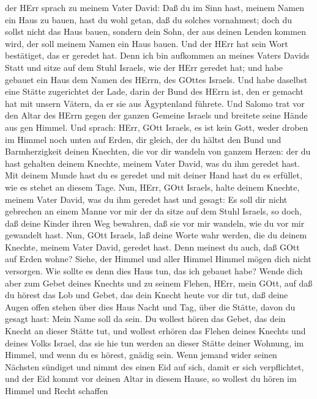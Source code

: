 der HErr sprach zu meinem Vater David: Daß du im Sinn hast, meinem Namen
ein Haus zu bauen, hast du wohl getan, daß du solches vornahmest;
 doch du sollst nicht das Haus bauen, sondern dein Sohn,
der aus deinen Lenden kommen wird, der soll meinem Namen ein Haus bauen.
 Und der HErr hat sein Wort bestätiget, das er geredet hat.
Denn ich bin aufkommen an meines Vaters Davids Statt und sitze auf dem
Stuhl Israels, wie der HErr geredet hat; und habe gebauet ein Haus dem
Namen des HErrn, des GOttes Israels.  Und habe daselbst
eine Stätte zugerichtet der Lade, darin der Bund des HErrn ist, den er
gemacht hat mit unsern Vätern, da er sie aus Ägyptenland führete.
 Und Salomo trat vor den Altar des HErrn gegen der ganzen
Gemeine Israels und breitete seine Hände aus gen Himmel. 
Und sprach: HErr, GOtt Israels, es ist kein Gott, weder droben im Himmel
noch unten auf Erden, dir gleich, der du hältst den Bund und
Barmherzigkeit deinen Knechten, die vor dir wandeln von ganzem Herzen:
 der du hast gehalten deinem Knechte, meinem Vater David,
was du ihm geredet hast. Mit deinem Munde hast du es geredet und mit
deiner Hand hast du es erfüllet, wie es stehet an diesem Tage.
 Nun, HErr, GOtt Israels, halte deinem Knechte, meinem
Vater David, was du ihm geredet hast und gesagt: Es soll dir nicht
gebrechen an einem Manne vor mir der da sitze auf dem Stuhl Israels, so
doch, daß deine Kinder ihren Weg bewahren, daß sie vor mir wandeln, wie
du vor mir gewandelt hast.  Nun, GOtt Israels, laß deine
Worte wahr werden, die du deinem Knechte, meinem Vater David, geredet
hast.  Denn meinest du auch, daß GOtt auf Erden wohne?
Siehe, der Himmel und aller Himmel Himmel mögen dich nicht versorgen.
Wie sollte es denn dies Haus tun, das ich gebauet habe? 
Wende dich aber zum Gebet deines Knechts und zu seinem Flehen, HErr,
mein GOtt, auf daß du hörest das Lob und Gebet, das dein Knecht heute
vor dir tut,  daß deine Augen offen stehen über dies Haus
Nacht und Tag, über die Stätte, davon du gesagt hast: Mein Name soll da
sein. Du wollest hören das Gebet, das dein Knecht an dieser Stätte tut,
 und wollest erhören das Flehen deines Knechts und deines
Volks Israel, das sie hie tun werden an dieser Stätte deiner Wohnung, im
Himmel, und wenn du es hörest, gnädig sein.  Wenn jemand
wider seinen Nächsten sündiget und nimmt des einen Eid auf sich, damit
er sich verpflichtet, und der Eid kommt vor deinen Altar in diesem
Hause,  so wollest du hören im Himmel und Recht schaffen
